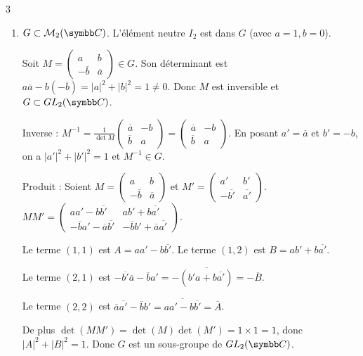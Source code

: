 \begin{correction}{3}
\begin{enumerate}
    \item $G \subset \mathcal{M}_{2}(\C)$. L'élément neutre $I_2$ est dans $G$ (avec $a=1, b=0$).

    Soit $M = \begin{pmatrix}a&b\\ -\overline{b}&\overline{a}\end{pmatrix} \in G$. 
    Son déterminant est $a\overline{a} - b(-\overline{b}) = |a|^2 + |b|^2 = 1 \neq 0$. 
    Donc $M$ est inversible et $G \subset GL_2(\C)$.

    Inverse : $M^{-1} = \frac{1}{\det M} \begin{pmatrix}\overline{a}&-b\\ \overline{b}&a\end{pmatrix} = \begin{pmatrix}\overline{a}&-b\\ \overline{b}&a\end{pmatrix}$. 
    En posant $a'=\overline{a}$ et $b'=-b$, on a $|a'|^2+|b'|^2=1$ et $M^{-1} \in G$.

    Produit : Soient $M = \begin{pmatrix}a&b\\ -\overline{b}&\overline{a}\end{pmatrix}$ et $M' = \begin{pmatrix}a'&b'\\ -\overline{b'}&\overline{a'}\end{pmatrix}$.
    $M M' = \begin{pmatrix} aa' - b\overline{b'} & ab' + b\overline{a'} \\ -\overline{b}a' - \overline{a}\overline{b'} & -\overline{b}b' + \overline{a}\overline{a'} \end{pmatrix}$.
    
    Le terme $(1,1)$ est $A = aa' - b\overline{b'}$. Le terme $(1,2)$ est $B = ab' + b\overline{a'}$.
    
    Le terme $(2,1)$ est $-\overline{b'} \overline{a} - \overline{b} a' = -\overline{(b'a + b\overline{a'})} = -\overline{B}$.
    
    Le terme $(2,2)$ est $\overline{a}\overline{a'} - \overline{b}b' = \overline{aa' - b\overline{b'}} = \overline{A}$.

    De plus $\det(MM') = \det(M)\det(M') = 1 \times 1 = 1$, donc $|A|^2+|B|^2=1$.
    Donc $G$ est un sous-groupe de $GL_2(\C)$.


\end{enumerate}
\end{correction}
